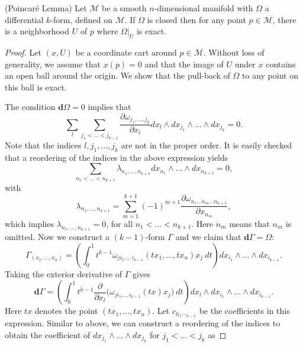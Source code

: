 \begin{theorem} \label{theorem:2.4}
(Poincar\'e Lemma) Let $\mathcal M$ be a smooth $n$-dimensional manifold with $\Omega$ a differential $k$-form, defined on $\mathcal M$. If $\Omega$ is closed then for any point $p\in \mathcal M$, there is a neighborhood $U$ of $p$ where $\Omega|_{U}$ is exact.
\end{theorem}

\begin{proof}
Let $(x,U)$ be a coordinate cart around $p\in \mathcal M$. Without loss of generality, we assume that $x(p)=0$ and that the image of $U$ under $x$ contains an open ball around the origin. We show that the pull-back of $\Omega$ to any point on this ball is exact.

The condition $\mathbf d \Omega = 0$ implies that
\begin{equation*}
	\sum_l \sum_{j_1<\dots<j_{k-1}} \frac{\partial \omega_{j_1,\dots,j_k}}{\partial x_l} dx_l\wedge dx_{j_1}\wedge \dots \wedge dx_{j_k} = 0.
\end{equation*}
Note that the indices $l,j_1,\dots,j_k$ are not in the proper order. It is easily checked that a reordering of the indices in the above expression yields
\begin{equation*}
	\sum_{n_1<\dots<n_{k+1}}\lambda_{n_1,\dots,n_{k+1}} dx_{n_1}\wedge \dots \wedge dx_{n_{k+1}} = 0,
\end{equation*}
with
\begin{equation*}
	\lambda_{n_1,\dots,n_{k+1}} = \sum_{m=1}^{k+1} (-1)^{m+1} \frac{\partial \omega_{n_1\dots\mathring n_m \dots n_{k+1}}}{\partial x_{n_m}},
\end{equation*}
which implies $\lambda_{n_1,\dots,n_{k+1}} = 0$, for all $n_1<\dots<n_{k+1}$. Here $\mathring n_m$ means that $n_m$ is omitted. Now we construct a $(k-1)$-form $\Gamma$ and we claim that $\mathbf d \Gamma = \Omega$:
\begin{equation*}
	\Gamma_{(x_1,\dots,x_n)} = \left( \int_0^1 t^{k-1} \omega_{ji_1\dots,i_{k-1}}(tx_1,\dots,tx_n) x_j \ dt \right) dx_{i_1}\wedge \dots \wedge dx_{i_{k-1}}.
\end{equation*}
Taking the exterior derivative of $\Gamma$ gives
\begin{equation*}
	\mathbf d \Gamma = \left( \int_0^1 t^{k-1} \frac{\partial }{\partial x_l} \big( \omega_{ji_1\dots,i_{k-1}}(tx) x_j \big) \ dt \right) dx_l\wedge dx_{i_1}\wedge \dots \wedge dx_{i_{k-1}}.
\end{equation*}
Here $tx$ denotes the point $(tx_1,\dots,tx_n)$. Let $c_{li_1\dotsi_{k-1}}$ be the coefficients in this expression. Similar to above, we can construct a reordering of the indices to obtain the coefficient of $dx_{j_1}\wedge\dots\wedge dx_{j_k}$ for $j_1<\dots<j_{k}$ as

\end{proof}
